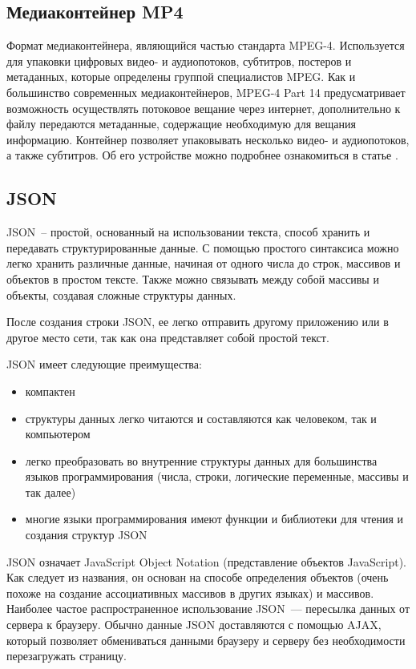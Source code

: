 \subsection{Медиаконтейнер MP4}
Формат медиаконтейнера, являющийся частью стандарта MPEG-4.
Используется для упаковки цифровых видео- и аудиопотоков, субтитров, постеров и метаданных,
которые определены группой специалистов MPEG.
Как и большинство современных медиаконтейнеров, MPEG-4 Part 14 предусматривает возможность
осуществлять потоковое вещание через интернет, дополнительно к файлу передаются метаданные,
содержащие необходимую для вещания информацию.
Контейнер позволяет упаковывать несколько видео- и аудиопотоков, а также субтитров.
Об его устройстве можно подробнее ознакомиться в статье \cite{mp4_doc}.

\subsection{JSON}
JSON~-- простой, основанный на использовании текста, способ хранить и передавать структурированные
данные. С помощью простого синтаксиса  можно легко хранить различные данные, начиная от одного числа
до строк, массивов и объектов в простом тексте. Также можно связывать между собой массивы и объекты,
создавая сложные структуры данных.

После создания строки JSON, ее легко отправить другому приложению или в другое место сети,
так как она представляет собой простой текст.

\medskip
JSON имеет следующие преимущества:
\smallskip
\begin{itemize}
	\item  компактен
	\item структуры данных легко читаются и составляются как человеком, так и компьютером
	\item легко преобразовать во внутренние структуры данных для большинства языков программирования
	(числа, строки, логические переменные, массивы и так далее)
	\item многие языки программирования имеют функции и библиотеки для чтения и создания структур JSON
\end{itemize}

JSON означает JavaScript Object Notation (представление объектов JavaScript). Как следует из названия,
он основан на способе определения объектов (очень похоже на создание ассоциативных массивов в других
языках) и массивов.
Наиболее частое распространенное использование JSON~--- пересылка данных от сервера к браузеру. Обычно
данные JSON доставляются с помощью AJAX, который позволяет обмениваться данными браузеру и серверу без
необходимости перезагружать страницу.

